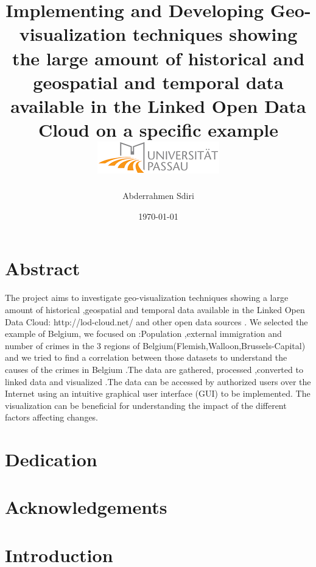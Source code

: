 \documentclass[a4paper,12pt,oneside]{report}
\begin{document}
\title{
{ Implementing and Developing Geo-visualization techniques showing the large amount of historical and geospatial and temporal data available in the Linked Open Data Cloud on a specific example }\\
{\includegraphics{university.png}}}
\author{Abderrahmen Sdiri}
\date{\today}
\maketitle
\chapter*{Abstract}
{The project aims to investigate geo-visualization techniques showing a large amount of historical ,geospatial and temporal data available in the Linked Open Data Cloud: http://lod-cloud.net/ and other open data sources . We selected the example of Belgium, we focused on :Population ,external immigration and number of  crimes  in the 3 regions of Belgium(Flemish,Walloon,Brussels-Capital) and we tried to find a  correlation between those datasets to understand the causes of the crimes in Belgium .The data are gathered, processed ,converted to linked data  and visualized .The data  can be accessed by authorized users over the Internet using an intuitive graphical user interface (GUI) to be implemented. The visualization can be beneficial for understanding the impact of the different factors affecting changes.}
\chapter*{Dedication}
\chapter*{Acknowledgements}
\tableofcontents
\listoffigures
\listoftables
\newpage
{}
 \chapter{Introduction}
\end{document}
